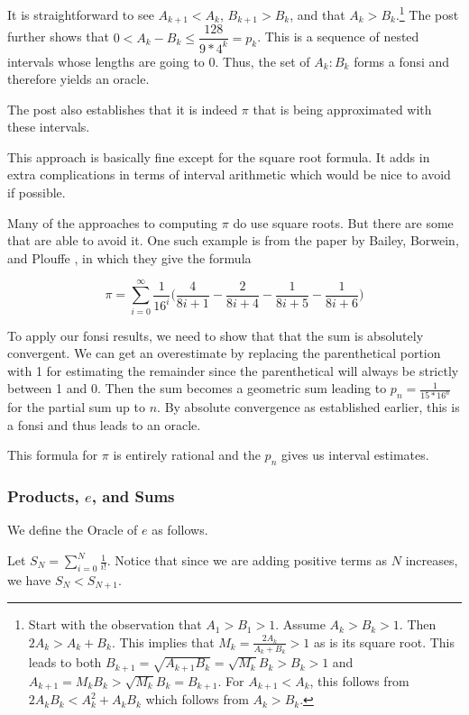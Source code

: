 \documentclass[12pt]{article}
\begin{document}
It is straightforward to see $A_{k+1} < A_k$, $B_{k+1} > B_k$, and that $A_k > B_k$.\footnote{Start with the observation that $A_1 > B_1 > 1$. Assume $A_k > B_k > 1$. Then $2 A_k  > A_k + B_k$. This implies that $M_k = \frac{2A_k}{A_k + B_k}>1$ as is its square root. This leads to both $B_{k+1} =  \sqrt{A_{k+1} B_k} = \sqrt{M_k} B_k > B_k > 1$  and $A_{k+1} = M_k B_k > \sqrt{M_k} B_k = B_{k+1}$.  For $A_{k+1} < A_k$, this follows from $2A_k B_k < A_k^2 + A_kB_k$ which follows from $A_k > B_k$.} The post further shows that $0 < A_k - B_k \leq \dfrac{128}{9*4^k} = p_k $. This is a sequence of nested intervals whose lengths are going to 0. Thus, the set of $A_k:B_k$ forms a fonsi and therefore yields an oracle. 

The post also establishes that it is indeed $\pi$ that is being approximated with these intervals.

This approach is basically fine except for the square root formula. It adds in extra complications in terms of interval arithmetic which would be nice to avoid if possible. 

Many of the approaches to computing $\pi$ do use square roots. But there are some that are able to avoid it. One such example is from the paper by Bailey, Borwein, and Plouffe \cite{BBP}, in which they give the formula 

\[ 
\pi = \sum_{i=0}^\infty \frac{1}{16^i} \bigg( \frac{4}{8i+1} - \frac{2}{8i+4} - \frac{1}{8i+5} - \frac{1}{8i+6} \bigg)
\]


To apply our fonsi results, we need to show that that the sum is absolutely convergent. We can get an overestimate by replacing the parenthetical portion with 1 for estimating the remainder since the parenthetical will always be strictly between 1 and 0. Then the sum becomes a geometric sum leading to $p_n = \frac{1}{15*16^n}$ for the partial sum up to $n$. By absolute convergence as established earlier, this is a fonsi and thus leads to an oracle.  

This formula for $\pi$ is entirely rational and the $p_n$ gives us interval estimates.

\subsubsection{Products, \texorpdfstring{$e$}{e}, and Sums}\label{sec:e}

We define the Oracle of $e$ as follows. 

Let $S_N = \sum_{i=0}^N \frac{1}{i!}$. Notice that since we are adding positive terms as $N$ increases, we have $S_N < S_{N+1}$. 
\end{document}
